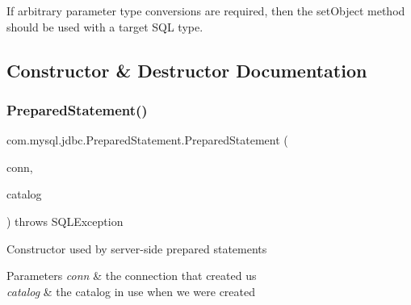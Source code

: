 If arbitrary parameter type conversions are required, then the set\+Object method should be used with a target S\+QL type. 

\subsection{Constructor \& Destructor Documentation}
\mbox{\label{classcom_1_1mysql_1_1jdbc_1_1_prepared_statement_af1784431accedc207e4dc40ff2f7f9e5}} 
\subsubsection{\texorpdfstring{Prepared\+Statement()}{PreparedStatement()}\hspace{0.1cm}{\footnotesize\ttfamily [1/3]}}
{\footnotesize\ttfamily com.\+mysql.\+jdbc.\+Prepared\+Statement.\+Prepared\+Statement (\begin{DoxyParamCaption}\item[{\mbox{\hyperlink{interfacecom_1_1mysql_1_1jdbc_1_1_my_s_q_l_connection}{My\+S\+Q\+L\+Connection}}}]{conn,  }\item[{String}]{catalog }\end{DoxyParamCaption}) throws S\+Q\+L\+Exception}

Constructor used by server-\/side prepared statements


\begin{DoxyParams}{Parameters}
{\em conn} & the connection that created us \\
\hline
{\em catalog} & the catalog in use when we were created\\
\hline
\end{DoxyParams}

